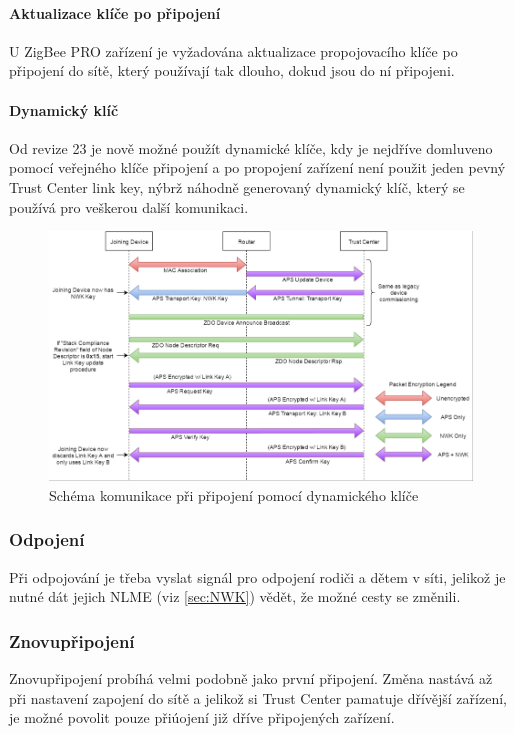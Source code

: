 \documentclass[a4paper,10pt,titlepage]{article}
\begin{document}
\paragraph{Aktualizace klíče po připojení}
U ZigBee PRO zařízení je vyžadována aktualizace propojovacího klíče po připojení do sítě, který používají tak dlouho, dokud jsou do ní připojeni.

\paragraph{Dynamický klíč}
Od revize 23 je nově možné použít dynamické klíče, kdy je nejdříve domluveno pomocí veřejného klíče připojení a po propojení zařízení není použit jeden pevný Trust Center link key, nýbrž náhodně generovaný dynamický klíč, který se používá pro veškerou další komunikaci.

\begin{figure}[H] \label{fig:join_dynamic}
	\centering
	\includegraphics[width=\textwidth]{assets/join_dynamic.png}
	\caption[Schéma komunikace při připojení pomocí dynamického klíče]{Schéma komunikace při připojení pomocí dynamického klíče~\cite{ti-security}}
\end{figure}

\subsubsection{Odpojení}
Při odpojování je třeba vyslat signál pro odpojení rodiči a dětem v síti, jelikož je nutné dát jejich NLME (viz \ref{sec:NWK}) vědět, že možné cesty se změnili.

\subsubsection{Znovupřipojení}
Znovupřipojení probíhá velmi podobně jako první připojení. Změna nastává až při nastavení zapojení do sítě a jelikož si Trust Center pamatuje dřívější zařízení, je možné povolit pouze přiúojení již dříve připojených zařízení.
\end{document}

